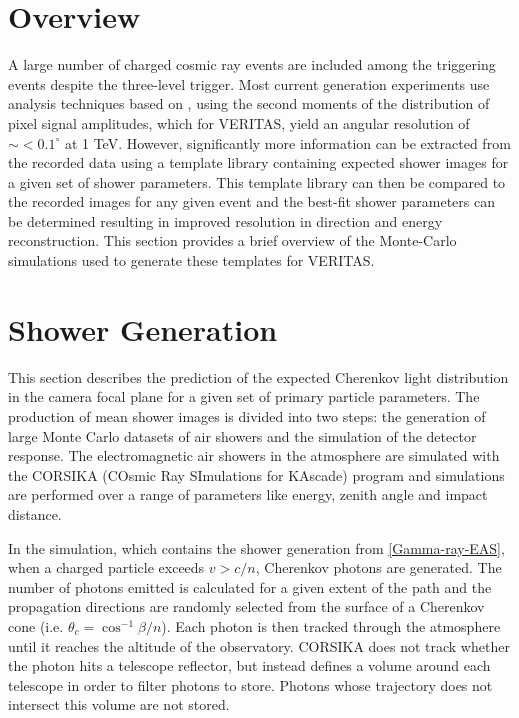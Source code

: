 \documentclass[main.tex]{subfiles}
\begin{document}
\section{Overview}
A large number of charged cosmic ray events are included among the triggering events despite the three-level trigger. Most current generation experiments use analysis techniques based on \cite{Hillas:1985}, using the second moments of the distribution of pixel signal amplitudes, which for VERITAS, yield an angular resolution of $\sim <0.1^\circ$ at 1 TeV. However, significantly more information can be extracted from the recorded data using a template library containing expected shower images for a given set of shower parameters. This template library can then be compared to the recorded images for any given event and the best-fit shower parameters can be determined resulting in improved resolution in direction and energy reconstruction. This section provides a brief overview of the Monte-Carlo simulations used to generate these templates for VERITAS.

\section{Shower Generation}
This section describes the prediction of the expected Cherenkov light distribution in the camera focal plane for a given set of primary particle parameters. The production of mean shower images is divided into two steps: the generation of large Monte Carlo datasets of air showers and the simulation of the detector response. The electromagnetic air showers in the atmosphere are simulated with the CORSIKA (COsmic Ray SImulations for KAscade) program and simulations are performed over a range of parameters like energy, zenith angle and impact distance. 

In the simulation, which contains the shower generation from \ref{Gamma-ray-EAS}, when a charged particle exceeds $v>c/n$, Cherenkov photons are generated. The number of photons emitted is calculated for a given extent of the path and the propagation directions are randomly selected from the surface of a Cherenkov cone (i.e. $\theta_c = \cos^{-1}\beta/n$). Each photon is then tracked through the atmosphere until it reaches the altitude of the observatory. CORSIKA does not track whether the photon hits a telescope reflector, but instead defines a volume around each telescope in order to filter photons to store. Photons whose trajectory does not intersect this volume are not stored.
\end{document}
